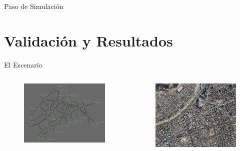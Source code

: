 \documentclass[aspectratio=169]{beamer}
\begin{document}
\begin{frame}{Paso de Simulación}
\begin{figure}
    \centering
\end{figure}
\end{frame}

\section{Validación y Resultados}

\begin{frame}{El Escenario}
\begin{columns}
    \begin{column}{.5\linewidth}
        \begin{figure}[p]
            \centering
            \includegraphics[width=\linewidth]{figuras/costanera.png}
        \end{figure}
    \end{column}
    \begin{column}{.5\linewidth}
        \begin{figure}[p]
            \centering
            \includegraphics[width=\linewidth]{figuras/costanera_maps.png}

\end{figure}
\end{column}
\end{columns}
\end{frame}
\end{document}

